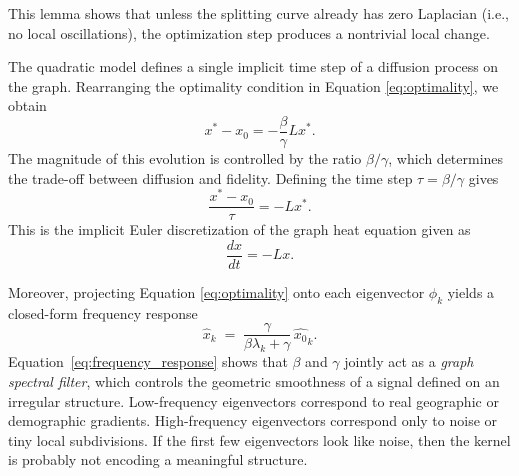 \documentclass[11pt]{article}
\begin{document}
This lemma shows that unless the splitting curve already has zero Laplacian (i.e., no local oscillations), the optimization step produces a nontrivial local change.

The quadratic model defines a single implicit time step of a diffusion process on the graph. Rearranging the optimality condition in Equation \ref{eq:optimality}, we obtain
\[
x^* - x_0 = -\frac{\beta}{\gamma} L x^*.
\]
The magnitude of this evolution is controlled by the ratio $\beta/\gamma$, which determines the trade-off between diffusion and fidelity. Defining the time step $\tau = \beta/\gamma$ gives
\[
\frac{x^*-x_0}{\tau} = -L x^*.
\]
This is the implicit Euler discretization of the graph heat equation \cite{evans2022partial} given as
\[
\frac{dx}{dt} = -Lx.
\]

Moreover, projecting Equation \ref{eq:optimality} onto each eigenvector $\phi_k$ yields a closed-form frequency response
\begin{equation}
    \label{eq:frequency_response}
    \hat{x}_k
    \;=\;
    \frac{\gamma}{\beta \lambda_k + \gamma} \,\hat{x_0}_k.
\end{equation}
Equation~\ref{eq:frequency_response} shows that $\beta$ and $\gamma$ jointly act as a \textit{graph spectral filter}, which controls the geometric smoothness of a signal defined on an irregular structure. Low-frequency eigenvectors correspond to real geographic or demographic gradients. High-frequency eigenvectors correspond only to noise or tiny local subdivisions. If the first few eigenvectors look like noise, then the kernel is probably not encoding a meaningful structure.




\end{document}
